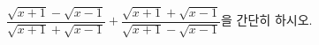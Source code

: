 \hspace*{2mm}\begin{minipage}[t]{\dimexpr\linewidth-2mm\relax}\vspace{0pt}
$\dfrac{\sqrt{x+1}-\sqrt{x-1}}{\sqrt{x+1}+\sqrt{x-1}}+\dfrac{\sqrt{x+1}+\sqrt{x-1}}{\sqrt{x+1}-\sqrt{x-1}}$을 간단히 하시오.\end{minipage}
